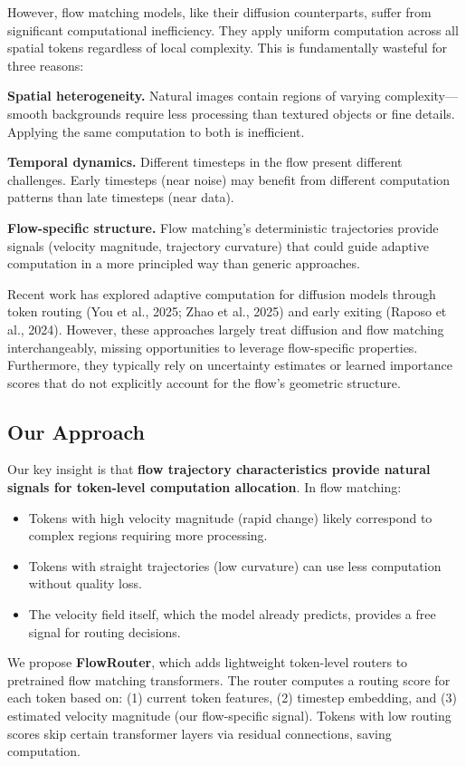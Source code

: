 \documentclass{article}
\begin{document}
However, flow matching models, like their diffusion counterparts, suffer from significant computational inefficiency. They apply uniform computation across all spatial tokens regardless of local complexity. This is fundamentally wasteful for three reasons:

\textbf{Spatial heterogeneity.} Natural images contain regions of varying complexity---smooth backgrounds require less processing than textured objects or fine details. Applying the same computation to both is inefficient.

\textbf{Temporal dynamics.} Different timesteps in the flow present different challenges. Early timesteps (near noise) may benefit from different computation patterns than late timesteps (near data).

\textbf{Flow-specific structure.} Flow matching's deterministic trajectories provide signals (velocity magnitude, trajectory curvature) that could guide adaptive computation in a more principled way than generic approaches.

Recent work has explored adaptive computation for diffusion models through token routing (You et al., 2025; Zhao et al., 2025) and early exiting (Raposo et al., 2024). However, these approaches largely treat diffusion and flow matching interchangeably, missing opportunities to leverage flow-specific properties. Furthermore, they typically rely on uncertainty estimates or learned importance scores that do not explicitly account for the flow's geometric structure.

\subsection{Our Approach}

Our key insight is that \textbf{flow trajectory characteristics provide natural signals for token-level computation allocation}. In flow matching:
\begin{itemize}
    \item Tokens with high velocity magnitude (rapid change) likely correspond to complex regions requiring more processing.
    \item Tokens with straight trajectories (low curvature) can use less computation without quality loss.
    \item The velocity field itself, which the model already predicts, provides a free signal for routing decisions.
\end{itemize}

We propose \textbf{FlowRouter}, which adds lightweight token-level routers to pretrained flow matching transformers. The router computes a routing score for each token based on: (1) current token features, (2) timestep embedding, and (3) estimated velocity magnitude (our flow-specific signal). Tokens with low routing scores skip certain transformer layers via residual connections, saving computation.
\end{document}
